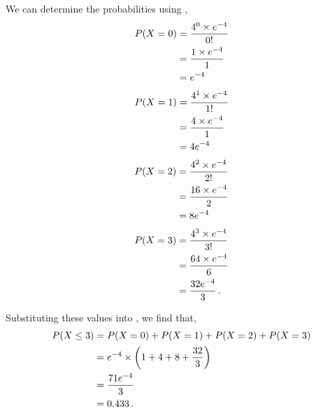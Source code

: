 \begin{subquestions}
We can determine the probabilities using ,
\begin{align}
	P(X=0) & = \frac{4^0 \times e^{-4}}{0!} \nonumber \\
	       & = \frac{1 \times e^{-4}}{1} \nonumber \\
	       & = e^{-4} 
\end{align}
\begin{align}
	P(X=1) & = \frac{4^1 \times e^{-4}}{1!} \nonumber \\
	       & = \frac{4 \times e^{-4}}{1} \nonumber \\
	       & = 4e^{-4}
\end{align}
\begin{align}
	P(X=2) & = \frac{4^2 \times e^{-4}}{2!} \nonumber \\
	       & = \frac{16 \times e^{-4}}{2} \nonumber \\
	       & = 8e^{-4}
\end{align}
\begin{align}
	P(X=3) & = \frac{4^3 \times e^{-4}}{3!} \nonumber \\
	       & = \frac{64 \times e^{-4}}{6} \nonumber \\
	       & = \frac{32e^{-4}}{3}\,.
\end{align}

Substituting these values into , we find that,
\begin{align}
	P(X \leq 3) & = P(X=0)+P(X=1)+P(X=2)+P(X=3) \nonumber \\
	            & = e^{-4} \times \left(1+4+8+\frac{32}{3}\right) \nonumber \\
	            & = \frac{71e^{-4}}{3} \nonumber \\
	            & = 0.433 \,.
\end{align}


\end{subquestions}